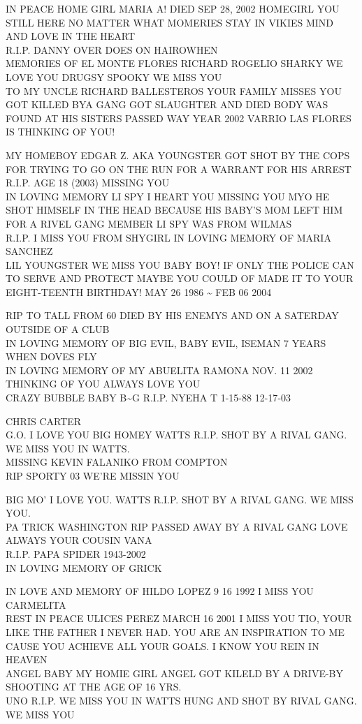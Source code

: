 \documentclass[10pt,letterpaper]{article}
\begin{document}
IN PEACE HOME GIRL MARIA A!  DIED SEP 28, 2002 HOMEGIRL YOU STILL HERE NO MATTER WHAT MOMERIES STAY IN VIKIES MIND AND LOVE IN THE HEART\\
R.I.P. DANNY OVER DOES ON HAIROWHEN\\
MEMORIES OF EL MONTE FLORES RICHARD ROGELIO SHARKY WE LOVE YOU DRUGSY SPOOKY WE MISS YOU\\
TO MY UNCLE RICHARD BALLESTEROS YOUR FAMILY MISSES YOU GOT KILLED BYA GANG GOT SLAUGHTER AND DIED BODY WAS FOUND AT HIS SISTERS PASSED WAY YEAR 2002 VARRIO LAS FLORES IS THINKING OF YOU!

MY HOMEBOY EDGAR Z. AKA YOUNGSTER GOT SHOT BY THE COPS FOR TRYING TO GO ON THE RUN FOR A WARRANT FOR HIS ARREST R.I.P. AGE 18 (2003) MISSING YOU\\
IN LOVING MEMORY LI SPY I HEART YOU MISSING YOU MYO HE SHOT HIMSELF IN THE HEAD BECAUSE HIS BABY'S MOM LEFT HIM FOR A RIVEL GANG MEMBER LI SPY WAS FROM WILMAS\\
R.I.P. I MISS YOU FROM SHYGIRL IN LOVING MEMORY OF MARIA SANCHEZ\\
LIL YOUNGSTER WE MISS YOU BABY BOY!  IF ONLY THE POLICE CAN TO SERVE AND PROTECT MAYBE YOU COULD OF MADE IT TO YOUR EIGHT{-}TEENTH BIRTHDAY!  MAY 26 1986 \textasciitilde{} FEB 06 2004

RIP TO TALL FROM 60 DIED BY HIS ENEMYS AND ON A SATERDAY OUTSIDE OF A CLUB\\
IN LOVING MEMORY OF BIG EVIL, BABY EVIL, ISEMAN 7 YEARS WHEN DOVES FLY\\
IN LOVING MEMORY OF MY ABUELITA RAMONA NOV. 11 2002 THINKING OF YOU ALWAYS LOVE YOU\\
CRAZY BUBBLE BABY B\textasciitilde{}G R.I.P. NYEHA T 1{-}15{-}88 12{-}17{-}03

CHRIS CARTER\\
G.O. I LOVE YOU BIG HOMEY WATTS R.I.P.  SHOT BY A RIVAL GANG.  WE MISS YOU IN WATTS.\\
MISSING KEVIN FALANIKO FROM COMPTON\\
RIP SPORTY 03 WE'RE MISSIN YOU

BIG MO' I LOVE YOU. WATTS R.I.P. SHOT BY A RIVAL GANG.  WE MISS YOU.\\
PA TRICK WASHINGTON RIP PASSED AWAY BY A RIVAL GANG LOVE ALWAYS YOUR COUSIN VANA\\
R.I.P. PAPA SPIDER 1943{-}2002\\
IN LOVING MEMORY OF GRICK

IN LOVE AND MEMORY OF HILDO LOPEZ 9 16 1992 I MISS YOU CARMELITA\\
REST IN PEACE ULICES PEREZ MARCH 16 2001 I MISS YOU TIO, YOUR LIKE THE FATHER I NEVER HAD.  YOU ARE AN INSPIRATION TO ME CAUSE YOU ACHIEVE ALL YOUR GOALS.  I KNOW YOU REIN IN HEAVEN\\
ANGEL BABY MY HOMIE GIRL ANGEL GOT KILELD BY A DRIVE{-}BY SHOOTING AT THE AGE OF 16 YRS.\\
UNO R.I.P.  WE MISS YOU IN WATTS HUNG AND SHOT BY RIVAL GANG.  WE MISS YOU
\end{document}

